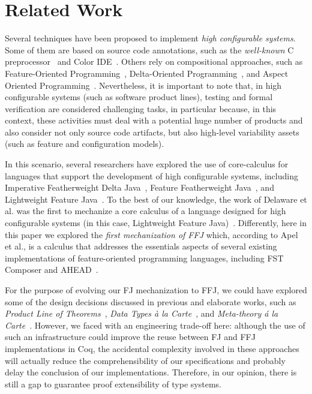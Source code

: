 \chapter{Related Work}\label{seq:related}

Several techniques have been proposed to implement
\emph{high configurable systems}. Some of
them are based on source code annotations, such as
the \emph{well-known} C preprocessor~\cite{stallman:cpp} and Color IDE~\cite{kastner:icse2008}. Others
rely on compositional approaches, such as
Feature-Oriented Programming~\cite{batory-tse2004,batory_feature-oriented_2004},
Delta-Oriented Programming~\cite{schaefer_delta-oriented_2010}, 
and Aspect Oriented Programming~\cite{kiczales:ecoop2001,alves:splc2005}.
Nevertheless, it is important to
note that, in high configurable systems (such as software
product lines), testing and formal verification are considered
challenging tasks, in particular because, in this context,
these activities must deal with a potential huge number of
products and also consider not only source code artifacts,
but also high-level variability assets (such as feature and
configuration models).

In this scenario, several researchers have explored
the use of core-calculus for languages that
support the development of high configurable systems,
including Imperative Featherweight Delta Java~\cite{schaefer:aosd2011}, Feature
Featherweight Java~\cite{apel_feature_2008}, and Lightweight Feature Java~\cite{delaware:fse-2009}.
To the best of our knowledge, the work of Delaware
et al. was the first to mechanize a core calculus
of a language designed for high configurable systems (in
this case, Lightweight Feature Java)~\cite{delaware:fse-2009}. Differently, here in
this paper we explored the \emph{first mechanization of \gls{FFJ}}
which, according to Apel et al., is a calculus that
addresses the essentials aspects of several
existing implementations of feature-oriented programming
languages, including FST Composer and AHEAD~\cite{apel_feature_2008}. 

For the purpose of evolving our \gls{FJ} mechanization
to \gls{FFJ}, we could have explored some of the
design decisions discussed in previous and elaborate works, such as
\emph{Product Line of Theorems}~\cite{delaware:oopsla2011},
\emph{Data Types \`{a} la Carte}~\cite{swierstra_2008},
and \emph{Meta-theory \'{a} la Carte}~\cite{delaware:popl2013}.
However, we faced with
an engineering trade-off here: although the use of such an
infrastructure could improve the reuse between \gls{FJ} and \gls{FFJ}
implementations in Coq, the accidental complexity involved in
these approaches will actually reduce the comprehensibility of our
specifications and probably delay the conclusion of our
implementations. Therefore, in our opinion, there is still a
gap to guarantee proof extensibility of type systems. 

